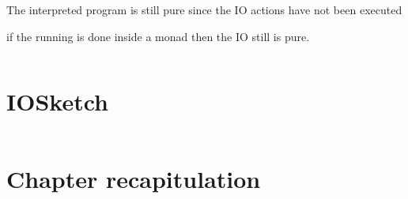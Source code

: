 \documentclass[thesis-solanki.tex]{subfiles}
\begin{document}
The interpreted program is still pure since the IO actions have not been executed 

if the running is done inside a monad then the IO still is pure.


\begin{code-list}[H]
\begin{singlespace}

  \inputminted[linenos]{haskell}{haskell-proto4-platen-winkel.hs}
\end{singlespace}
\caption{}
\label{}
\end{code-list}


\section{IOSketch}

\begin{code-list}[H]
\begin{singlespace}
\inputminted[linenos]{haskell}{IOSketch.hs}
\end{singlespace}
\caption{}
\label{}
\end{code-list}


\section{Chapter recapitulation}

\ifMain
\begin{scope}
  \nolinenumbers
  \enotesize
  \par
  \begin{singlespace}
  \setlength{\parskip}{12pt plus 2pt minus 1pt}
  \theendnotes
  \par
  \end{singlespace}
\end{scope}
\fi
\end{document}
